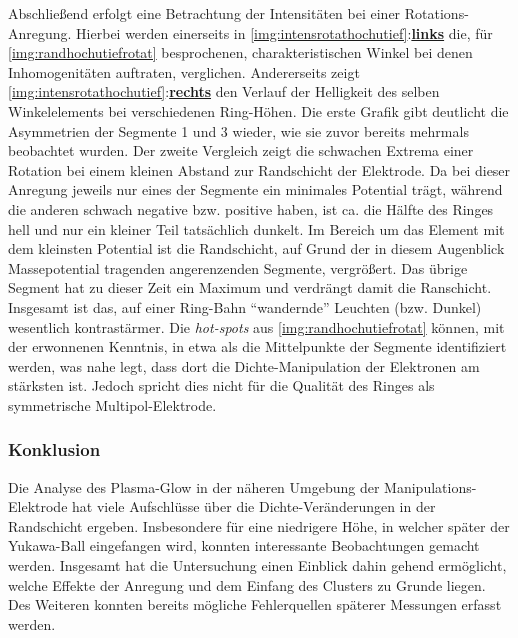 \documentclass[numbers=noenddot,a4paper]{scrartcl}
\newcommand{\tilt}[1]{\textit{#1}}
\newcommand{\fett}[1]{\textbf{#1}}
\begin{document}
					Abschließend erfolgt eine Betrachtung der Intensitäten bei einer Rotations-Anregung. Hierbei werden einerseits in \ref{img:intensrotathochutief}:\underline{\fett{links}} die, für \ref{img:randhochutiefrotat} besprochenen, charakteristischen Winkel bei denen Inhomogenitäten auftraten, verglichen. Andererseits zeigt \ref{img:intensrotathochutief}:\underline{\fett{rechts}} den Verlauf der Helligkeit des selben Winkelelements bei verschiedenen Ring-Höhen. Die erste Grafik gibt deutlicht die Asymmetrien der Segmente 1 und 3 wieder, wie sie zuvor bereits mehrmals beobachtet wurden. Der zweite Vergleich zeigt die schwachen Extrema einer Rotation bei einem kleinen Abstand zur Randschicht der Elektrode. Da bei dieser Anregung jeweils nur eines der Segmente ein minimales Potential tr\"agt, w\"ahrend die anderen schwach negative bzw. positive haben, ist ca. die H\"alfte des Ringes hell und nur ein kleiner Teil tats\"achlich dunkelt. Im Bereich um das Element mit dem kleinsten Potential ist die Randschicht, auf Grund der in diesem Augenblick Massepotential tragenden angerenzenden Segmente, vergr\"o{\ss}ert. Das \"ubrige Segment hat zu dieser Zeit ein Maximum und verdr\"angt damit die Ranschicht. Insgesamt ist das, auf einer Ring-Bahn ``wandernde'' Leuchten (bzw. Dunkel) wesentlich kontrast\"armer. Die \tilt{hot-spots} aus \ref{img:randhochutiefrotat} k\"onnen, mit der erwonnenen Kenntnis, in etwa als die Mittelpunkte der Segmente identifiziert werden, was nahe legt, dass dort die Dichte-Manipulation der Elektronen am st\"arksten ist. Jedoch spricht dies nicht f\"ur die Qualit\"at des Ringes als symmetrische Multipol-Elektrode.

				\subsubsection*{Konklusion}

						Die Analyse des Plasma-Glow in der näheren Umgebung der Manipulations-Elektrode hat viele Aufschlüsse über die Dichte-Veränderungen in der Randschicht ergeben. Insbesondere für eine niedrigere Höhe, in welcher später der Yukawa-Ball eingefangen wird, konnten interessante Beobachtungen gemacht werden. Insgesamt hat die Untersuchung einen Einblick dahin gehend ermöglicht, welche Effekte der Anregung und dem Einfang des Clusters zu Grunde liegen. Des Weiteren konnten bereits mögliche Fehlerquellen späterer Messungen erfasst werden.
\end{document}
